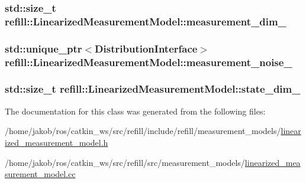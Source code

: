 \subsubsection[{\texorpdfstring{measurement\+\_\+dim\+\_\+}{measurement_dim_}}]{\setlength{\rightskip}{0pt plus 5cm}std\+::size\+\_\+t refill\+::\+Linearized\+Measurement\+Model\+::measurement\+\_\+dim\+\_\+\hspace{0.3cm}{\ttfamily [protected]}}\hypertarget{classrefill_1_1LinearizedMeasurementModel_ac3f6cee57566f9494706f4e735a65c64}{}\label{classrefill_1_1LinearizedMeasurementModel_ac3f6cee57566f9494706f4e735a65c64}
\subsubsection[{\texorpdfstring{measurement\+\_\+noise\+\_\+}{measurement_noise_}}]{\setlength{\rightskip}{0pt plus 5cm}std\+::unique\+\_\+ptr$<${\bf Distribution\+Interface}$>$ refill\+::\+Linearized\+Measurement\+Model\+::measurement\+\_\+noise\+\_\+\hspace{0.3cm}{\ttfamily [protected]}}\hypertarget{classrefill_1_1LinearizedMeasurementModel_ac15f42823cd7fb338ea5bd79e528627a}{}\label{classrefill_1_1LinearizedMeasurementModel_ac15f42823cd7fb338ea5bd79e528627a}
\subsubsection[{\texorpdfstring{state\+\_\+dim\+\_\+}{state_dim_}}]{\setlength{\rightskip}{0pt plus 5cm}std\+::size\+\_\+t refill\+::\+Linearized\+Measurement\+Model\+::state\+\_\+dim\+\_\+\hspace{0.3cm}{\ttfamily [protected]}}\hypertarget{classrefill_1_1LinearizedMeasurementModel_affd27c9960289d05413760b4682140a1}{}\label{classrefill_1_1LinearizedMeasurementModel_affd27c9960289d05413760b4682140a1}


The documentation for this class was generated from the following files\+:\begin{DoxyCompactItemize}
\item 
/home/jakob/ros/catkin\+\_\+ws/src/refill/include/refill/measurement\+\_\+models/\hyperlink{linearized__measurement__model_8h}{linearized\+\_\+measurement\+\_\+model.\+h}\item 
/home/jakob/ros/catkin\+\_\+ws/src/refill/src/measurement\+\_\+models/\hyperlink{linearized__measurement__model_8cc}{linearized\+\_\+measurement\+\_\+model.\+cc}\end{DoxyCompactItemize}
